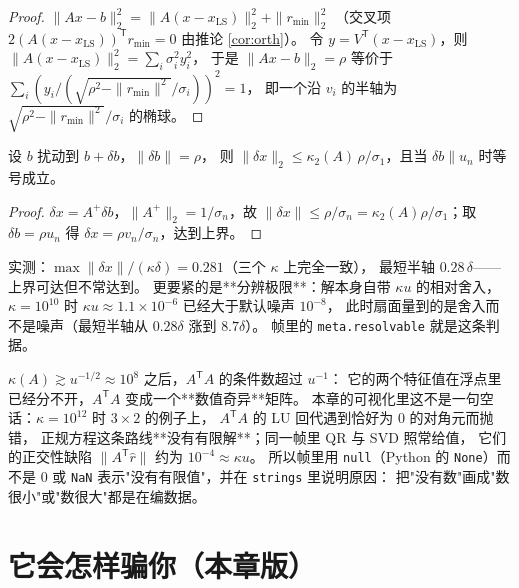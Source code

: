 \begin{proof}
$\|Ax-b\|_2^2=\|A(x-x_{\mathrm{LS}})\|_2^2+\|r_{\min}\|_2^2$
（交叉项 $2(A(x-x_{\mathrm{LS}}))^{\mathsf T}r_{\min}=0$ 由推论 \ref{cor:orth}）。
令 $y=V^{\mathsf T}(x-x_{\mathrm{LS}})$，则 $\|A(x-x_{\mathrm{LS}})\|_2^2=\sum_i\sigma_i^2y_i^2$，
于是 $\|Ax-b\|_2=\rho$ 等价于 $\sum_i(y_i/(\sqrt{\rho^2-\|r_{\min}\|^2}/\sigma_i))^2=1$，
即一个沿 $v_i$ 的半轴为 $\sqrt{\rho^2-\|r_{\min}\|^2}/\sigma_i$ 的椭球。
\end{proof}

\begin{theorem}[右端扰动在解上的放大]
\label{thm:fan}
设 $b$ 扰动到 $b+\delta b$，$\|\delta b\|=\rho$，
则 $\|\delta x\|_2\le\kappa_2(A)\,\rho/\sigma_1$，且当 $\delta b\parallel u_n$ 时等号成立。
\end{theorem}

\begin{proof}
$\delta x=A^{+}\delta b$，$\|A^{+}\|_2=1/\sigma_n$，故 $\|\delta x\|\le\rho/\sigma_n
=\kappa_2(A)\rho/\sigma_1$；取 $\delta b=\rho u_n$ 得 $\delta x=\rho v_n/\sigma_n$，达到上界。
\end{proof}

实测：$\max\|\delta x\|/(\kappa\delta)=0.281$（三个 $\kappa$ 上完全一致），
最短半轴 $0.28\,\delta$——上界可达但不常达到。
更要紧的是**分辨极限**：解本身自带 $\kappa u$ 的相对舍入，
$\kappa=10^{10}$ 时 $\kappa u\approx1.1\times10^{-6}$ 已经大于默认噪声 $10^{-8}$，
此时扇面量到的是舍入而不是噪声（最短半轴从 $0.28\delta$ 涨到 $8.7\delta$）。
帧里的 \texttt{meta.resolvable} 就是这条判据。

\begin{remark}
$\kappa(A)\gtrsim u^{-1/2}\approx10^{8}$ 之后，$A^{\mathsf T}A$ 的条件数超过 $u^{-1}$：
它的两个特征值在浮点里已经分不开，$A^{\mathsf T}A$ 变成一个**数值奇异**矩阵。
本章的可视化里这不是一句空话：$\kappa=10^{12}$ 时 $3\times2$ 的例子上，
$A^{\mathsf T}A$ 的 LU 回代遇到恰好为 $0$ 的对角元而抛错，
正规方程这条路线**没有有限解**；同一帧里 QR 与 SVD 照常给值，
它们的正交性缺陷 $\|A^{\mathsf T}\hat r\|$ 约为 $10^{-4}\approx\kappa u$。
所以帧里用 \texttt{null}（Python 的 \texttt{None}）而不是 $0$ 或 \texttt{NaN}
表示"没有有限值"，并在 \texttt{strings} 里说明原因：
把"没有数"画成"数很小"或"数很大"都是在编数据。
\end{remark}

\section{它会怎样骗你（本章版）}

